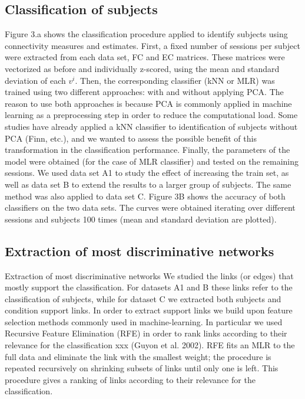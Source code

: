 \documentclass{article}
\begin{document}
\subsection{Classification of subjects}

Figure 3.a shows the classification procedure applied to identify subjects using connectivity measures and estimates. First, a fixed number of sessions per subject were extracted from each data set, FC and EC matrices. These matrices were vectorized as before and individually z-scored, using the mean and standard deviation of each $v^i$. Then, the corresponding classifier (kNN or MLR) was trained using two different approaches: with and without applying PCA. The reason to use both approaches is because PCA is commonly applied in machine learning as a preprocessing step in order to reduce the computational load. Some studies have already applied a kNN classifier to identification of subjects without PCA (Finn, etc.), and we wanted to assess the possible benefit of this transformation in the classification performance. Finally, the parameters of the model were obtained (for the case of MLR classifier) and tested on the remaining sessions. We used data set A1 to study the effect of increasing the train set, as well as data set B to extend the results to a larger group of subjects. The same method was also applied to data set C. Figure 3B shows the accuracy of both classifiers on the two data sets. The curves were obtained iterating over different sessions and subjects 100 times (mean and standard deviation are plotted).

\subsection{Extraction of most discriminative networks}

Extraction of most discriminative networks
We studied the links (or edges) that mostly support the classification. For datasets A1 and B these links refer to the classification of subjects, while for dataset C we extracted both subjects and condition support links.
In order to extract support links we build upon feature selection methods commonly used in machine-learning. In particular we used Recursive Feature Elimination (RFE) in order to rank links according to their relevance for the classification xxx (Guyon et al. 2002). RFE fits an MLR to the full data and eliminate the link with the smallest weight; the procedure is repeated recursively on shrinking subsets of links until only one is left. This procedure gives a ranking of links according to their relevance for the classification.
\end{document}
